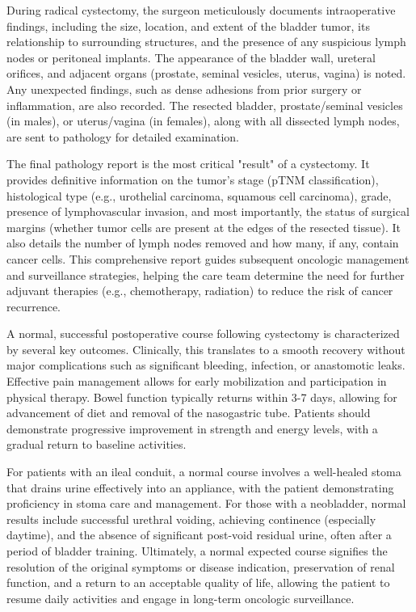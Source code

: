 During radical cystectomy, the surgeon meticulously documents intraoperative findings, including the size, location, and extent of the bladder tumor, its relationship to surrounding structures, and the presence of any suspicious lymph nodes or peritoneal implants. The appearance of the bladder wall, ureteral orifices, and adjacent organs (prostate, seminal vesicles, uterus, vagina) is noted. Any unexpected findings, such as dense adhesions from prior surgery or inflammation, are also recorded. The resected bladder, prostate/seminal vesicles (in males), or uterus/vagina (in females), along with all dissected lymph nodes, are sent to pathology for detailed examination.

The final pathology report is the most critical "result" of a cystectomy. It provides definitive information on the tumor's stage (pTNM classification), histological type (e.g., urothelial carcinoma, squamous cell carcinoma), grade, presence of lymphovascular invasion, and most importantly, the status of surgical margins (whether tumor cells are present at the edges of the resected tissue). It also details the number of lymph nodes removed and how many, if any, contain cancer cells. This comprehensive report guides subsequent oncologic management and surveillance strategies, helping the care team determine the need for further adjuvant therapies (e.g., chemotherapy, radiation) to reduce the risk of cancer recurrence.

A normal, successful postoperative course following cystectomy is characterized by several key outcomes. Clinically, this translates to a smooth recovery without major complications such as significant bleeding, infection, or anastomotic leaks. Effective pain management allows for early mobilization and participation in physical therapy. Bowel function typically returns within 3-7 days, allowing for advancement of diet and removal of the nasogastric tube. Patients should demonstrate progressive improvement in strength and energy levels, with a gradual return to baseline activities.

For patients with an ileal conduit, a normal course involves a well-healed stoma that drains urine effectively into an appliance, with the patient demonstrating proficiency in stoma care and management. For those with a neobladder, normal results include successful urethral voiding, achieving continence (especially daytime), and the absence of significant post-void residual urine, often after a period of bladder training. Ultimately, a normal expected course signifies the resolution of the original symptoms or disease indication, preservation of renal function, and a return to an acceptable quality of life, allowing the patient to resume daily activities and engage in long-term oncologic surveillance.

